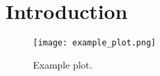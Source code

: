\section{Introduction}

\begin{figure}[tbh]
\centering
  \texttt{[image: example\_plot.png]}
  \caption{Example plot.}
\end{figure}
